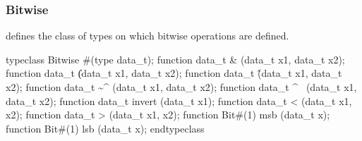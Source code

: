 \subsubsection{Bitwise}

 defines the class of types on which bitwise operations
    are defined.



\begin{libverbatim}
   typeclass Bitwise #(type data_t);
       function data_t \& (data_t x1, data_t x2);
       function data_t \| (data_t x1, data_t x2);
       function data_t \^ (data_t x1, data_t x2);
       function data_t \~^ (data_t x1, data_t x2);
       function data_t \^~ (data_t x1, data_t x2);
       function data_t invert (data_t x1);
       function data_t \<< (data_t x1, x2);
       function data_t \>> (data_t x1, x2);
       function Bit#(1) msb (data_t x);
       function Bit#(1) lsb (data_t x);
   endtypeclass
\end{libverbatim}

